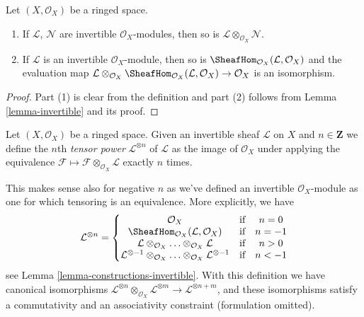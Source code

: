 \begin{lemma}
\label{lemma-constructions-invertible}
Let $(X, \mathcal{O}_X)$ be a ringed space.
\begin{enumerate}
\item If $\mathcal{L}$, $\mathcal{N}$ are invertible
$\mathcal{O}_X$-modules, then so is
$\mathcal{L} \otimes_{\mathcal{O}_X} \mathcal{N}$.
\item If $\mathcal{L}$ is an invertible $\mathcal{O}_X$-module, then so is
$\SheafHom_{\mathcal{O}_X}(\mathcal{L}, \mathcal{O}_X)$ and the evaluation map
$\mathcal{L} \otimes_{\mathcal{O}_X}
\SheafHom_{\mathcal{O}_X}(\mathcal{L}, \mathcal{O}_X) \to \mathcal{O}_X$
is an isomorphism.
\end{enumerate}
\end{lemma}

\begin{proof}
Part (1) is clear from the definition and part (2) follows from
Lemma \ref{lemma-invertible} and its proof.
\end{proof}

\begin{definition}
\label{definition-powers}
Let $(X, \mathcal{O}_X)$ be a ringed space. Given an invertible sheaf
$\mathcal{L}$ on $X$ and $n \in \mathbf{Z}$ we define the
$n$th {\it tensor power} $\mathcal{L}^{\otimes n}$ of $\mathcal{L}$
as the image of $\mathcal{O}_X$ under applying the equivalence
$\mathcal{F} \mapsto\mathcal{F} \otimes_{\mathcal{O}_X} \mathcal{L}$
exactly $n$ times.
\end{definition}

\noindent
This makes sense also for negative $n$ as we've defined an invertible
$\mathcal{O}_X$-module as one for which tensoring is an equivalence.
More explicitly, we have
$$
\mathcal{L}^{\otimes n} =
\left\{
\begin{matrix}
\mathcal{O}_X & \text{if} & n = 0 \\
\SheafHom_{\mathcal{O}_X}(\mathcal{L}, \mathcal{O}_X) & \text{if} & n = -1\\
\mathcal{L} \otimes_{\mathcal{O}_X} \ldots \otimes_{\mathcal{O}_X} \mathcal{L}
& \text{if} & n > 0 \\
\mathcal{L}^{\otimes -1} \otimes_{\mathcal{O}_X} \ldots
\otimes_{\mathcal{O}_X} \mathcal{L}^{\otimes -1}
& \text{if} & n < -1
\end{matrix}
\right.
$$
see Lemma \ref{lemma-constructions-invertible}.
With this definition we have canonical isomorphisms
$\mathcal{L}^{\otimes n} \otimes_{\mathcal{O}_X}
\mathcal{L}^{\otimes m} \to
\mathcal{L}^{\otimes n + m}$, and these isomorphisms
satisfy a commutativity and an associativity constraint
(formulation omitted).


